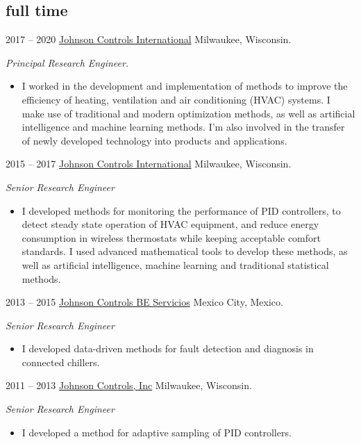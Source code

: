 \documentclass[]{friggeri-cv} %
\begin{document}
\subsection{full time}

\begin{entrylist}


\entry
{2017 -- 2020}
{\href{http://www.johnsoncontrols.com}{Johnson Controls International}}
{Milwaukee, Wisconsin.}
{
\emph{Principal Research Engineer.}
\begin{itemize}
	\item I worked in the development and implementation of methods to improve the efficiency of heating, ventilation and air conditioning (HVAC) systems. I make use of traditional and modern optimization methods, as well as artificial intelligence and machine learning methods. I'm also involved in the transfer of newly developed technology into products and applications.
\end{itemize}
}
\entry
{2015 -- 2017}
{\href{http://www.johnsoncontrols.com}{Johnson Controls International}}
{Milwaukee, Wisconsin.}
{
\emph{Senior Research Engineer}
\begin{itemize}
\item I developed methods for monitoring the performance of PID controllers, to detect steady state operation of HVAC equipment, and reduce energy consumption in wireless thermostats while keeping acceptable comfort standards. I used advanced mathematical tools to develop these methods, as well as artificial intelligence, machine learning and traditional statistical methods.
\end{itemize}
}

\entry
{2013 -- 2015}
{\href{http://www.johnsoncontrols.com/es_mx}{Johnson Controls BE Servicios}}
{Mexico City, Mexico.}
{
\emph{Senior Research Engineer}
\begin{itemize}
\item I developed data-driven methods for fault detection and diagnosis in connected chillers.
\end{itemize}
}

\entry
{2011 -- 2013}
{\href{http://www.johnsoncontrols.com}{Johnson Controls, Inc}}
{Milwaukee, Wisconsin.}
{
\emph{Senior Research Engineer}
\begin{itemize}
\item I developed a method for adaptive sampling of PID controllers.
\end{itemize}
}

\end{entrylist}
\end{document}
